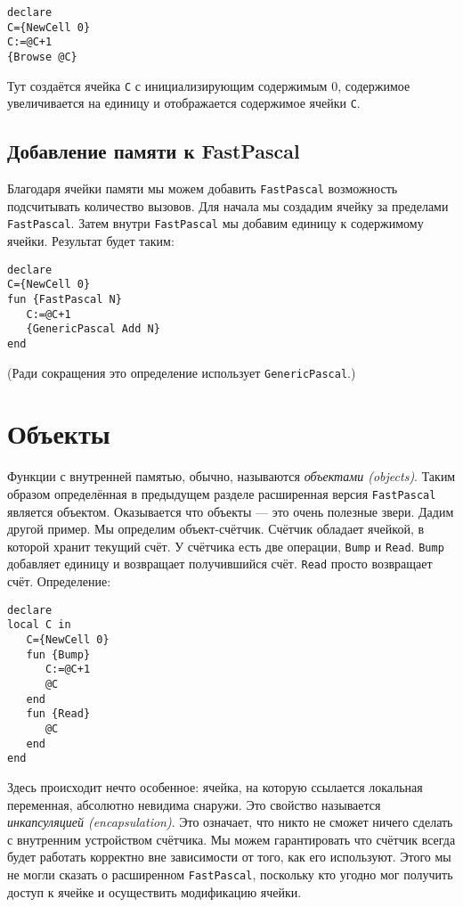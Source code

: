 \begin{lstlisting}
declare
C={NewCell 0}
C:=@C+1
{Browse @C}
\end{lstlisting}

Тут создаётся ячейка \lstinline|C| с инициализирующим содержимым $0$, содержимое увеличивается на единицу и отображается содержимое ячейки \lstinline|C|.

\subsection{Добавление памяти к FastPascal}

Благодаря ячейки памяти мы можем добавить \lstinline|FastPascal| возможность подсчитывать количество вызовов. Для начала мы создадим ячейку за пределами \lstinline|FastPascal|. Затем внутри \lstinline|FastPascal| мы добавим единицу к содержимому ячейки. Результат будет таким:

\begin{lstlisting}
declare
C={NewCell 0}
fun {FastPascal N}
   C:=@C+1
   {GenericPascal Add N}
end
\end{lstlisting}

(Ради сокращения это определение использует \lstinline|GenericPascal|.)

\section{Объекты}

Функции с внутренней памятью, обычно, называются \emph{объектами (objects)}. Таким образом определённая в предыдущем разделе расширенная версия \lstinline|FastPascal| является объектом. Оказывается что объекты --- это очень полезные звери. Дадим другой пример. Мы определим объект-счётчик. Счётчик обладает ячейкой, в которой хранит текущий счёт. У счётчика есть две операции, \lstinline|Bump| и \lstinline|Read|. \lstinline|Bump| добавляет единицу и возвращает получившийся счёт. \lstinline|Read| просто возвращает счёт. Определение:

\begin{lstlisting}
declare
local C in
   C={NewCell 0}
   fun {Bump}
      C:=@C+1
      @C
   end
   fun {Read}
      @C
   end
end
\end{lstlisting}

Здесь происходит нечто особенное: ячейка, на которую ссылается локальная переменная, абсолютно невидима снаружи. Это свойство называется \emph{инкапсуляцией (encapsulation)}. Это означает, что никто не сможет ничего сделать с внутренним устройством счётчика. Мы можем гарантировать что счётчик всегда будет работать корректно вне зависимости от того, как его используют. Этого мы не могли сказать о расширенном \lstinline|FastPascal|, поскольку кто угодно мог получить доступ к ячейке и осуществить модификацию ячейки.

